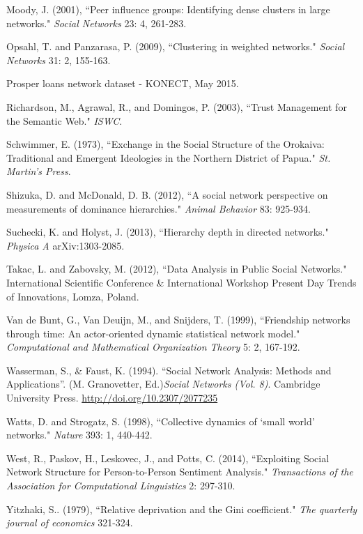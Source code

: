 \documentclass[3p,times]{elsarticle}
\begin{document}
\begin{thebibliography}{9}
	Moody, J. (2001),
	``Peer influence groups: Identifying dense clusters in large networks."
	\textit{Social Networks} 23: 4, 261-283.
	
	Opsahl, T. and Panzarasa, P. (2009),
	``Clustering in weighted networks."
	\textit{Social Networks} 31: 2, 155-163.
	
	Prosper loans network dataset - KONECT, May 2015.
	
	Richardson, M., Agrawal, R., and Domingos, P. (2003),
	``Trust Management for the Semantic Web." \textit{ISWC}.
	
	Schwimmer, E. (1973),
	``Exchange in the Social Structure of the Orokaiva: Traditional and Emergent Ideologies in the Northern District of Papua." \textit{St. Martin's Press}.
	
	Shizuka, D. and McDonald, D. B. (2012),
	``A social network perspective on measurements of dominance hierarchies." 
	\textit{Animal Behavior} 83: 925-934.
	
	Suchecki, K. and Holyst, J. (2013),
	``Hierarchy depth in directed networks." 
	\textit{Physica A} arXiv:1303-2085.
	
	Takac, L. and Zabovsky, M. (2012),
	``Data Analysis in Public Social Networks."
	International Scientific Conference \& International Workshop Present Day Trends of Innovations, Lomza, Poland.
	
	Van de Bunt, G., Van Deuijn, M., and Snijders, T. (1999),
	``Friendship networks through time: An actor-oriented dynamic statistical network model."
	\textit{Computational and Mathematical Organization Theory} 5: 2, 167-192.
	
	Wasserman, S., \& Faust, K. (1994). ``Social Network Analysis: Methods and Applications''. (M. Granovetter, Ed.)\emph{Social Networks (Vol. 8)}. Cambridge University Press. \href{http://doi.org/10.2307/2077235}{http://doi.org/10.2307/2077235}
	
	Watts, D. and Strogatz, S. (1998),
	``Collective dynamics of `small world' networks."
	\textit{Nature} 393: 1, 440-442.
	
	West, R., Paskov, H., Leskovec, J., and Potts, C. (2014),
	``Exploiting Social Network Structure for Person-to-Person Sentiment Analysis."
	\textit{Transactions of the Association for Computational Linguistics} 2: 297-310.
	
	Yitzhaki, S.. (1979), ``Relative deprivation and the Gini coefficient." \emph{The quarterly journal of economics} 321-324.

	


    
    
    
\end{thebibliography}


\end{document}
